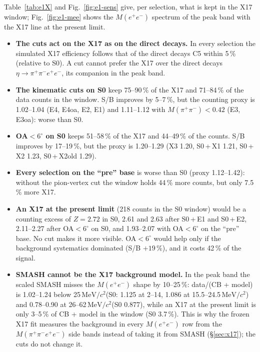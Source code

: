 \documentclass[11pt,a4paper]{article}
\newcommand{\ppee}{\ensuremath{\pi^{+}\pi^{-}e^{+}e^{-}}\xspace}
\newcommand{\Mfour}{\ensuremath{M(\pi^{+}\pi^{-}e^{+}e^{-})}\xspace}
\newcommand{\Mee}{\ensuremath{M(e^{+}e^{-})}\xspace}
\newcommand{\Mpipi}{\ensuremath{M(\pi^{+}\pi^{-})}\xspace}
\newcommand{\MeVcc}{\ensuremath{\mathrm{MeV}/c^{2}}\xspace}
\newcommand{\cs}[1]{\textsf{#1}}%
\begin{document}
Table~\ref{tab:e1X} and Fig.~\ref{fig:e1-sens} give, per selection, what is kept in the X17 window; Fig.~\ref{fig:e1-mee} shows the \Mee
spectrum of the peak band with the X17 line at the present limit.
\begin{itemize}\setlength{\itemsep}{1pt}
\item \textbf{The cuts act on the X17 as on the direct decays.} In every selection the simulated X17 efficiency follows that of the direct decays C5
      within 5\,\% (relative to S0). A cut cannot prefer the X17 over the direct decays $\eta\to\ppee$, its companion in the peak band.
\item \textbf{The kinematic cuts on S0} keep 75--90\,\% of the X17 and 71--84\,\% of the data counts in the window. S/B improves by 5--7\,\%, but
      the counting proxy is 1.02--1.04 (\cs{E4}, \cs{E4oa}, \cs{E2}, \cs{E1}) and 1.11--1.12 with \Mpipi$<0.42$ (\cs{E3}, \cs{E3oa}): worse than S0.
\item \textbf{OA$<6^\circ$ on S0} keeps 51--58\,\% of the X17 and 44--49\,\% of the counts. S/B improves by 17--19\,\%, but the proxy is 1.20--1.29
      (\cs{X3} 1.20, S0\,+\,\cs{X1} 1.21, S0\,+\,\cs{X2} 1.23, S0\,+\,\cs{X2old} 1.29).
\item \textbf{Every selection on the ``pre'' base} is worse than S0 (proxy 1.12--1.42): without the pion-vertex cut the window holds 44\,\% more counts,
      but only 7.5\,\% more X17.
\item \textbf{An X17 at the present limit} (218 counts in the S0 window) would be a counting excess of $Z=2.72$ in S0, 2.61 and 2.63 after
      S0\,+\,\cs{E1} and S0\,+\,\cs{E2}, 2.11--2.27 after OA$<6^\circ$ on S0, and 1.93--2.07 with OA$<6^\circ$ on the ``pre'' base. No cut makes it
      more visible. OA$<6^\circ$ would help only if the background systematics dominated (S/B $+19$\,\%), and it costs 42\,\% of the signal.
\item \textbf{SMASH cannot be the X17 background model.} In the peak band the scaled SMASH misses the \Mee shape by 10--25\,\%: data/(CB +
      model) is 1.02--1.24 below 25\,\MeVcc (S0: 1.125 at 2--14, 1.086 at 15.5--24.5\,\MeVcc) and 0.78--0.90 at 26--62\,\MeVcc (S0 0.877), while an
      X17 at the present limit is only 3--5\,\% of CB + model in the window (S0 3.7\,\%). This is why the frozen X17 fit measures the background
      in every \Mee row from the \Mfour side bands instead of taking it from SMASH (\S\ref{sec:x17}); the cuts do not change it.
\end{itemize}
\end{document}
